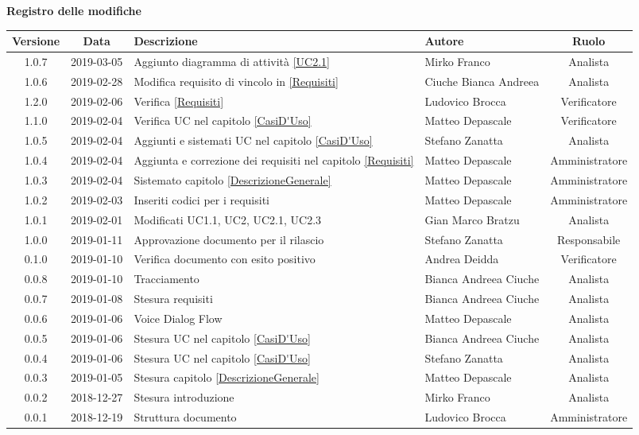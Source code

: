 	\begin{center}
		\textbf{Registro delle modifiche}
	\end{center}
	\begin{center}
		\begin{tabularx}{\textwidth}{|c|c|X|X|c|}
			\hline
			\textbf{Versione} & \textbf{Data} & \textbf{Descrizione} & \textbf{Autore} & \textbf{Ruolo} \\
			\hline
			1.0.7 & 2019-03-05 & Aggiunto diagramma di attività \ref{UC2.1} & Mirko Franco & Analista \\
			\hline
			1.0.6 & 2019-02-28 & Modifica requisito di vincolo in \ref{Requisiti}& Ciuche Bianca Andreea & Analista \\
			\hline
			1.2.0 & 2019-02-06 & Verifica \ref{Requisiti}& Ludovico Brocca & Verificatore \\
			\hline
			1.1.0 & 2019-02-04 & Verifica UC nel capitolo \ref{CasiD'Uso}& Matteo Depascale & Verificatore\\
			\hline
			1.0.5 & 2019-02-04 & Aggiunti e sistemati UC nel capitolo \ref{CasiD'Uso}& Stefano Zanatta & Analista\\
			\hline
			1.0.4 & 2019-02-04 & Aggiunta e correzione dei requisiti nel capitolo \ref{Requisiti}& Matteo Depascale & Amministratore\\
			\hline
			1.0.3 & 2019-02-04 & Sistemato capitolo \ref{DescrizioneGenerale}& Matteo Depascale & Amministratore\\
			\hline
			1.0.2 & 2019-02-03 & Inseriti codici per i requisiti & Matteo Depascale & Amministratore\\
			\hline
			1.0.1 & 2019-02-01 & Modificati UC1.1, UC2, UC2.1, UC2.3 & Gian Marco Bratzu & Analista\\
			\hline
			1.0.0 & 2019-01-11 & Approvazione documento per il rilascio& Stefano Zanatta & Responsabile\\
			\hline
			0.1.0 & 2019-01-10 & Verifica documento con esito positivo& Andrea Deidda & Verificatore\\
			\hline
			0.0.8 & 2019-01-10 & Tracciamento& Bianca Andreea Ciuche& Analista\\
			\hline
			0.0.7 & 2019-01-08 & Stesura requisiti & Bianca Andreea Ciuche& Analista\\
			\hline
			0.0.6 & 2019-01-06 & Voice Dialog Flow & Matteo Depascale & Analista\\
			\hline
			0.0.5 & 2019-01-06 & Stesura UC nel capitolo \ref{CasiD'Uso}& Bianca Andreea Ciuche & Analista\\
			\hline
			0.0.4 & 2019-01-06 & Stesura UC nel capitolo \ref{CasiD'Uso}& Stefano Zanatta & Analista\\
			\hline
			0.0.3 & 2019-01-05 & Stesura capitolo \ref{DescrizioneGenerale}& Matteo Depascale & Analista\\
			\hline
			0.0.2 & 2018-12-27 & Stesura introduzione & Mirko Franco & Analista\\
			\hline
			0.0.1 & 2018-12-19 & Struttura documento & Ludovico Brocca & Amministratore\\
			\hline
		\end{tabularx}
	\end{center}
\newpage
